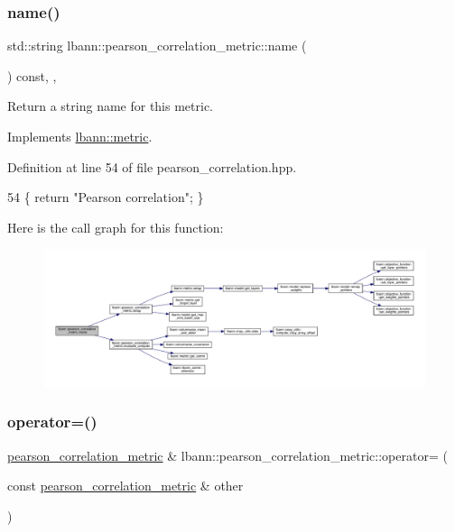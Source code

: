 \subsubsection{\texorpdfstring{name()}{name()}}
{\footnotesize\ttfamily std\+::string lbann\+::pearson\+\_\+correlation\+\_\+metric\+::name (\begin{DoxyParamCaption}{ }\end{DoxyParamCaption}) const\hspace{0.3cm}{\ttfamily [inline]}, {\ttfamily [override]}, {\ttfamily [virtual]}}

Return a string name for this metric. 

Implements \hyperlink{classlbann_1_1metric_af455d7b6874d3491bc04f0f2ebfcab51}{lbann\+::metric}.



Definition at line 54 of file pearson\+\_\+correlation.\+hpp.


\begin{DoxyCode}
54 \{ \textcolor{keywordflow}{return} \textcolor{stringliteral}{"Pearson correlation"}; \}
\end{DoxyCode}
Here is the call graph for this function\+:\nopagebreak
\begin{figure}[H]
\begin{center}
\leavevmode
\includegraphics[width=350pt]{classlbann_1_1pearson__correlation__metric_a7cbb12e258acdb0cbc4d521dc7163dd6_cgraph}
\end{center}
\end{figure}
\mbox{\label{classlbann_1_1pearson__correlation__metric_a5b88759076bc2f827b726e1541467b56}} 
\subsubsection{\texorpdfstring{operator=()}{operator=()}}
{\footnotesize\ttfamily \hyperlink{classlbann_1_1pearson__correlation__metric}{pearson\+\_\+correlation\+\_\+metric} \& lbann\+::pearson\+\_\+correlation\+\_\+metric\+::operator= (\begin{DoxyParamCaption}\item[{const \hyperlink{classlbann_1_1pearson__correlation__metric}{pearson\+\_\+correlation\+\_\+metric} \&}]{other }\end{DoxyParamCaption})}

